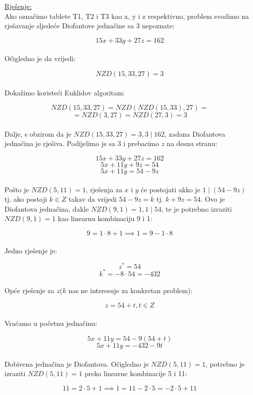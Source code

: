 \documentclass[12pt]{article}
\begin{document}
\underline{Rješenje:}\\

\hspace{0.65cm}Ako označimo tablete T1, T2 i T3 kao x, y i z respektivno, problem svodimo na rješavanje sljedeće Diofantove jednačine sa 3 nepoznate:

$$15x + 33y + 27z = 162$$\\

Očigledno je da vrijedi:

$$NZD(15, 33, 27) = 3$$\\

Dokažimo koristeći Euklidov algoritam:

$$NZD(15, 33, 27) = NZD(NZD(15, 33), 27) =$$ 
$$= NZD(3, 27) = NZD(27, 3) = 3$$\\

Dalje, s obzirom da je $NZD(15, 33, 27) = 3, 3 \mid 162$, zadana Diofantova jednačina je rješiva. Podijelimo je sa $3$ i prebacimo $z$ na desnu stranu:

$$15x + 33y + 27z = 162$$
$$5x + 11y + 9z = 54$$
$$5x + 11y = 54 - 9z$$\\

Pošto je $NZD(5, 11) = 1$, rješenja za $x$ i $y$ će postojati akko je $1 \mid (54 - 9z)$ tj. ako postoji $k\in Z$ takav da vrijedi $54 - 9z = k$ tj. $k + 9z = 54$. Ovo je Diofantova jednačina, dakle $NZD(9, 1) = 1, 1 \mid 54$, te je potrebno izraziti $NZD(9, 1) = 1$ kao linearnu kombinaciju 9 i 1:

$$9 = 1 \cdot 8 + 1 \implies 1 = 9 - 1 \cdot 8$$\\

Jedno rješenje je:

$$z^{*} = 54$$
$$k^{*} = - 8 \cdot 54 = - 432$$\\

Opće rješenje za $z$($k$ nas ne interesuje za konkretan problem):

$$z = 54 + t, t\in Z$$\\

Vraćamo u početnu jednačinu:

$$5x + 11y = 54 - 9(54 + t)$$
$$5x + 11y = -432 - 9t$$\\

Dobivena jednačina je Diofantova. Očigledno je $NZD(5, 11) = 1$, potrebno je izraziti $NZD(5, 11) = 1$ preko linearne kombinacije 5 i 11:

$$11 = 2 \cdot 5 + 1 \implies 1 = 11 - 2 \cdot 5 = - 2 \cdot 5 + 11$$\\
\end{document}
